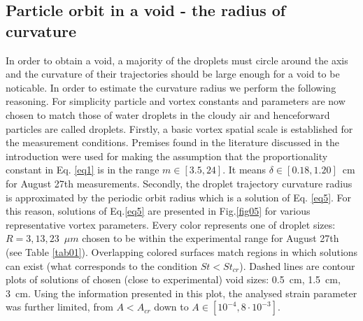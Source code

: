 \documentclass[../main.tex]{subfiles}
\begin{document}
\subsection{Particle orbit in a void - the radius of curvature}
\label{ssec:par}
In order to obtain a void, a majority of the droplets must circle around the axis and the curvature of their trajectories should be large enough for a void to be noticable. In order to estimate the curvature radius we perform the following reasoning. For simplicity particle and vortex constants and parameters are now chosen to match those of water droplets in the cloudy air and henceforward particles are called droplets.
Firstly, a basic vortex spatial scale is established for the measurement conditions. Premises found in the literature discussed in the introduction were used for making the assumption that the proportionality constant in Eq. \ref{eq1} is in the range $m\in[3.5, 24]$. It means $\delta \in [0.18,1.20]$~cm for August 27th measurements.
Secondly, the droplet trajectory curvature radius is approximated by the periodic orbit radius which is a solution of Eq. \ref{eq5}. For this reason, solutions of Eq.\ref{eq5} are presented in Fig.\ref{fig05} for various representative vortex parameters. Every color represents one of droplet sizes: $R=3,13,23$~$\mu m$ chosen to be within the experimental range for August 27th (see Table \ref{tab01}). Overlapping colored surfaces match regions in which solutions can exist (what corresponds to the condition $St<St_{cr}$). Dashed lines are contour plots of solutions of chosen (close to experimental) void sizes: 0.5~cm, 1.5~cm, 3~cm. Using the information presented in this plot, the analysed strain parameter was further limited, from $A<A_{cr}$ down to $A \in [10^{-4}, 8\cdot10^{-3}]$.
\end{document}
